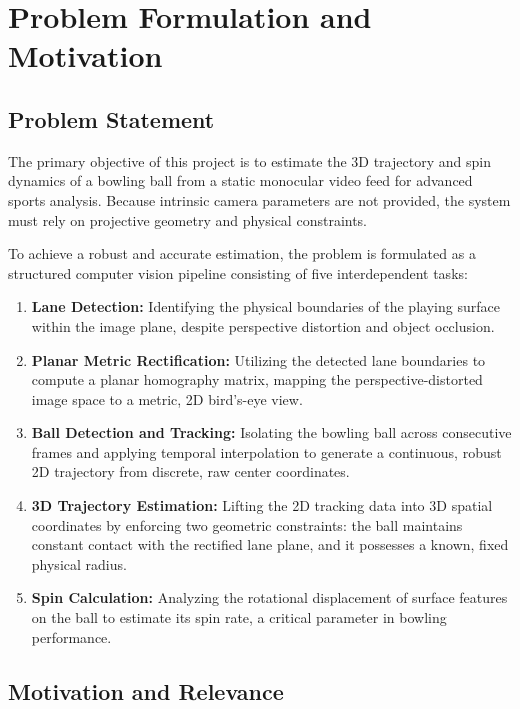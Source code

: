 \section{Problem Formulation and Motivation}
\subsection{Problem Statement}
The primary objective of this project is to estimate the 3D trajectory and spin dynamics of a bowling ball from a static monocular video feed for advanced sports analysis. Because intrinsic camera parameters are not provided, the system must rely on projective geometry and physical constraints.

To achieve a robust and accurate estimation, the problem is formulated as a structured computer vision pipeline consisting of five interdependent tasks:

\begin{enumerate}
    \item \textbf{Lane Detection:} Identifying the physical boundaries of the playing surface within the image plane, despite perspective distortion and object occlusion.
    
    \item \textbf{Planar Metric Rectification:} Utilizing the detected lane boundaries to compute a planar homography matrix, mapping the perspective-distorted image space to a metric, 2D bird's-eye view.
    
    \item \textbf{Ball Detection and Tracking:} Isolating the bowling ball across consecutive frames and applying temporal interpolation to generate a continuous, robust 2D trajectory from discrete, raw center coordinates.
    
    \item \textbf{3D Trajectory Estimation:} Lifting the 2D tracking data into 3D spatial coordinates by enforcing two geometric constraints: the ball maintains constant contact with the rectified lane plane, and it possesses a known, fixed physical radius.
    
    \item \textbf{Spin Calculation:} Analyzing the rotational displacement of surface features on the ball to estimate its spin rate, a critical parameter in bowling performance.
\end{enumerate}

\subsection{Motivation and Relevance}

